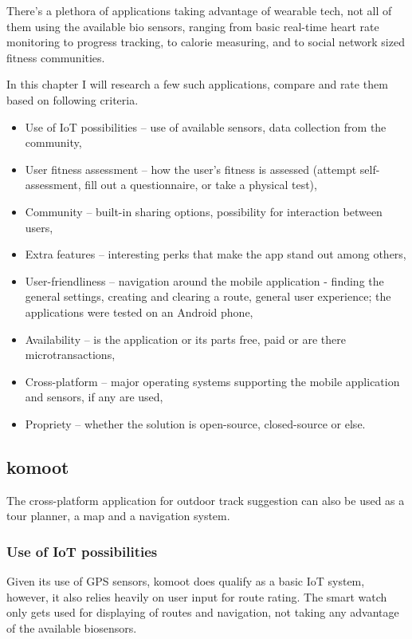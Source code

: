 There's a plethora of applications taking advantage of wearable tech, not all of them using the available bio sensors, ranging from basic real-time heart rate monitoring to progress tracking, to calorie measuring, and to social network sized fitness communities.

In this chapter I will research a few such applications, compare and rate them based on following criteria. 
\begin{itemize}
    \item Use of IoT possibilities -- use of available sensors, data collection from the community,
    \item User fitness assessment -- how the user's fitness is assessed (attempt self-assessment, fill out a questionnaire, or take a physical test),
    \item Community -- built-in sharing options, possibility for interaction between users,
    \item Extra features -- interesting perks that make the app stand out among others,
    \item User-friendliness -- navigation around the mobile application - finding the general settings, creating and clearing a route, general user experience; the applications were tested on an Android phone,
    \item Availability -- is the application or its parts free, paid or are there microtransactions,
    \item Cross-platform -- major operating systems supporting the mobile application and sensors, if any are used,
    \item Propriety -- whether the solution is open-source, closed-source or else.
\end{itemize}

\subsection{komoot}
The cross-platform application for outdoor track suggestion can also be used as a tour planner, a map and a navigation system.

\subsubsection*{Use of IoT possibilities}
Given its use of GPS sensors, komoot does qualify as a basic IoT system, however, it also relies heavily on user input for route rating.
The smart watch only gets used for displaying of routes and navigation, not taking any advantage of the available biosensors.

